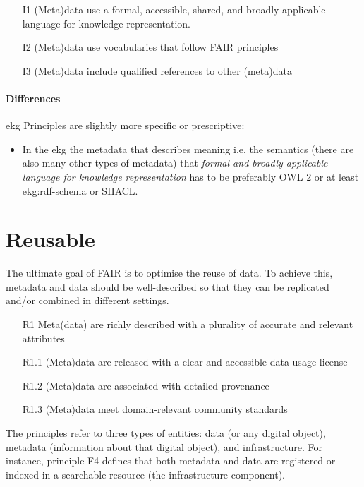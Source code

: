 \begin{itemize}
    \item[I1] (Meta)data use a formal, accessible, shared, and broadly applicable language for knowledge representation.
    \item[I2] (Meta)data use vocabularies that follow FAIR principles
    \item[I3] (Meta)data include qualified references to other (meta)data
\end{itemize}

\paragraph{Differences}

\gls{ekg} Principles are slightly more specific or prescriptive:

\begin{itemize}
    \item In the \gls{ekg} the metadata that describes meaning i.e. the semantics
          (there are also many other types of metadata) that
          \textit{formal and broadly applicable language for knowledge representation}
          has to be preferably OWL 2 or at least \gls{ekg:rdf-schema} or SHACL.
\end{itemize}


\section{Reusable}

The ultimate goal of FAIR is to optimise the reuse of data.
To achieve this, metadata and data should be well-described so that they can be replicated and/or
combined in different settings.

\begin{itemize}
    \item[R1] Meta(data) are richly described with a plurality of accurate and relevant attributes
    \item[R1.1] (Meta)data are released with a clear and accessible data usage license
    \item[R1.2] (Meta)data are associated with detailed provenance
    \item[R1.3] (Meta)data meet domain-relevant community standards
\end{itemize}

The principles refer to three types of entities: data (or any digital object),
metadata (information about that digital object), and infrastructure.
For instance, principle F4 defines that both metadata and data are registered or indexed in a
searchable resource (the infrastructure component).

